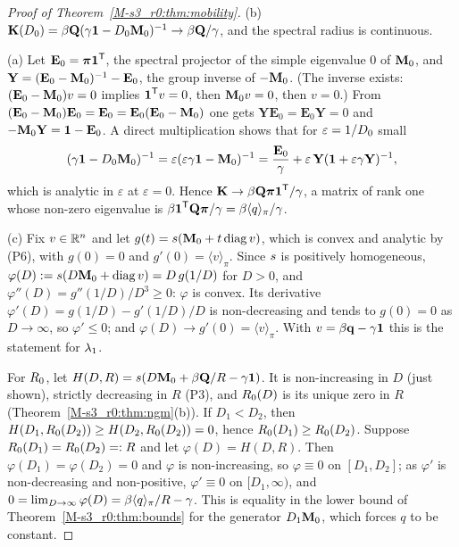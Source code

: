 \begin{proof}[Proof of Theorem~\ref{M-s3_r0:thm:mobility}]
  (b) $\mathbf{K}(D_0)=\beta\mathbf{Q}(\gamma\mathbf{1}-D_0\mathbf{M}_0)^{-1}\to\beta\mathbf{Q}/\gamma$, and the spectral radius is continuous.

  (a) Let $\mathbf{E}_0=\boldsymbol{\pi}\boldsymbol{1}^{\mathsf{T}}$, the spectral projector of the simple eigenvalue $0$ of $\mathbf{M}_0$, and
  $\mathbf{Y}=(\mathbf{E}_0-\mathbf{M}_0)^{-1}-\mathbf{E}_0$, the group inverse of $-\mathbf{M}_0$.  (The inverse exists:
  $(\mathbf{E}_0-\mathbf{M}_0)v=0$ implies $\boldsymbol{1}^{\mathsf{T}}v=0$, then $\mathbf{M}_0 v=0$, then $v=0$.)  From
  $(\mathbf{E}_0-\mathbf{M}_0)\mathbf{E}_0=\mathbf{E}_0=\mathbf{E}_0(\mathbf{E}_0-\mathbf{M}_0)$ one gets
  $\mathbf{Y}\mathbf{E}_0=\mathbf{E}_0\mathbf{Y}=0$ and $-\mathbf{M}_0\mathbf{Y}=\mathbf{1}-\mathbf{E}_0$.  A direct
  multiplication shows that for $\varepsilon=1/D_0$ small
  \begin{equation}\label{s3_r0:eq:resolvent}
    (\gamma\mathbf{1}-D_0\mathbf{M}_0)^{-1}=\varepsilon(\varepsilon\gamma\mathbf{1}-\mathbf{M}_0)^{-1}
      =\frac{\mathbf{E}_0}{\gamma}+\varepsilon\,\mathbf{Y}(\mathbf{1}+\varepsilon\gamma\mathbf{Y})^{-1},
  \end{equation}
  which is analytic in $\varepsilon$ at $\varepsilon=0$.  Hence $\mathbf{K}\to\beta\mathbf{Q}\boldsymbol{\pi}\boldsymbol{1}^{\mathsf{T}}/\gamma$, a matrix
  of rank one whose non-zero eigenvalue is $\beta\boldsymbol{1}^{\mathsf{T}}\mathbf{Q}\boldsymbol{\pi}/\gamma=\beta\langle q\rangle_{\pi}/\gamma$.

  (c) Fix $v\in\mathbb{R}^{n}$ and let $g(t)=s(\mathbf{M}_0+t\operatorname{diag} v)$, which is convex and analytic by (P6),
  with $g(0)=0$ and $g'(0)=\langle v\rangle_\pi$.  Since $s$ is positively homogeneous,
  $\varphi(D):=s(D\mathbf{M}_0+\operatorname{diag} v)=D\,g(1/D)$ for $D>0$, and $\varphi''(D)=g''(1/D)/D^3\ge0$: $\varphi$ is
  convex.  Its derivative $\varphi'(D)=g(1/D)-g'(1/D)/D$ is non-decreasing and tends to $g(0)=0$ as
  $D\to\infty$, so $\varphi'\le0$; and $\varphi(D)\to g'(0)=\langle v\rangle_\pi$.  With
  $v=\beta\mathbf{q}-\gamma\boldsymbol{1}$ this is the statement for $\lambda_1$.

  For $R_0$, let $H(D,R)=s(D\mathbf{M}_0+\beta\mathbf{Q}/R-\gamma\mathbf{1})$.  It is non-increasing in $D$ (just shown),
  strictly decreasing in $R$ (P3), and $R_0(D)$ is its unique zero in $R$
  (Theorem~\ref{M-s3_r0:thm:ngm}(b)).  If $D_1<D_2$, then $H(D_1,R_0(D_2))\ge H(D_2,R_0(D_2))=0$, hence
  $R_0(D_1)\ge R_0(D_2)$.  Suppose $R_0(D_1)=R_0(D_2)=:R$ and let $\varphi(D)=H(D,R)$.  Then
  $\varphi(D_1)=\varphi(D_2)=0$ and $\varphi$ is non-increasing, so $\varphi\equiv0$ on $[D_1,D_2]$; as $\varphi'$ is non-decreasing and
  non-positive, $\varphi'\equiv0$ on $[D_1,\infty)$, and $0=\lim_{D\to\infty}\varphi(D)=\beta\langle q\rangle_{\pi}/R-\gamma$.
  This is equality in the lower bound of Theorem~\ref{M-s3_r0:thm:bounds} for the generator $D_1\mathbf{M}_0$, which
  forces $q$ to be constant.
\end{proof}

